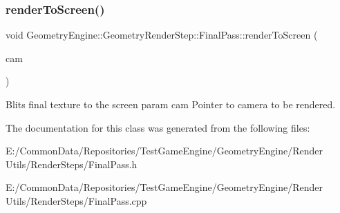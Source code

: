 \mbox{\label{class_geometry_engine_1_1_geometry_render_step_1_1_final_pass_a2eb4e66da61e2a33253d8110e0b64740}} 
\subsubsection{\texorpdfstring{renderToScreen()}{renderToScreen()}}
{\footnotesize\ttfamily void Geometry\+Engine\+::\+Geometry\+Render\+Step\+::\+Final\+Pass\+::render\+To\+Screen (\begin{DoxyParamCaption}\item[{\mbox{\hyperlink{class_geometry_engine_1_1_geometry_world_item_1_1_geometry_camera_1_1_camera}{Geometry\+World\+Item\+::\+Geometry\+Camera\+::\+Camera}} $\ast$}]{cam }\end{DoxyParamCaption})\hspace{0.3cm}{\ttfamily [protected]}}

Blits final texture to the screen param cam Pointer to camera to be rendered. 

The documentation for this class was generated from the following files\+:\begin{DoxyCompactItemize}
\item 
E\+:/\+Common\+Data/\+Repositories/\+Test\+Game\+Engine/\+Geometry\+Engine/\+Render Utils/\+Render\+Steps/Final\+Pass.\+h\item 
E\+:/\+Common\+Data/\+Repositories/\+Test\+Game\+Engine/\+Geometry\+Engine/\+Render Utils/\+Render\+Steps/Final\+Pass.\+cpp\end{DoxyCompactItemize}

